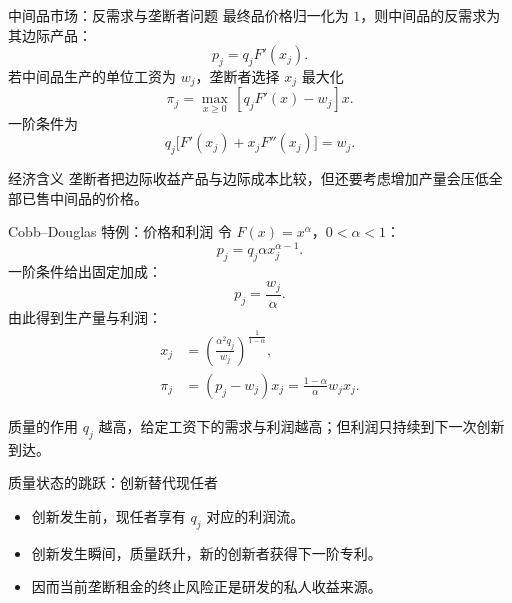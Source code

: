 \documentclass[aspectratio=32]{beamer}
\begin{document}
\begin{frame}{中间品市场：反需求与垄断者问题}
\small
最终品价格归一化为 $1$，则中间品的反需求为其边际产品：
\[
  \boxed{p_j=q_jF'(x_j)}.
\]
若中间品生产的单位工资为 $w_j$，垄断者选择 $x_j$ 最大化
\[
  \pi_j=\max_{x\geq0}\,[q_jF'(x)-w_j]x.
\]
一阶条件为
\[
  q_j\big[F'(x_j)+x_jF''(x_j)\big]=w_j.
\]
\begin{alertblock}{经济含义}
垄断者把边际收益产品与边际成本比较，但还要考虑增加产量会压低全部已售中间品的价格。
\end{alertblock}
\end{frame}

\begin{frame}{Cobb--Douglas 特例：价格和利润}
\small
令 $F(x)=x^\alpha$，$0<\alpha<1$：
\[
  p_j=q_j\alpha x_j^{\alpha-1}.
\]
一阶条件给出固定加成：
\[
  \boxed{p_j=\frac{w_j}{\alpha}}.
\]
由此得到生产量与利润：
\begin{align*}
  x_j&=\left(\frac{\alpha^2q_j}{w_j}\right)^{\frac{1}{1-\alpha}},\\
  \pi_j&=(p_j-w_j)x_j
  =\frac{1-\alpha}{\alpha}w_jx_j.
\end{align*}
\begin{block}{质量的作用}
$q_j$ 越高，给定工资下的需求与利润越高；但利润只持续到下一次创新到达。
\end{block}
\end{frame}

\begin{frame}{质量状态的跳跃：创新替代现任者}
\small
\begin{center}
\end{center}
\vspace{0.16cm}
\begin{itemize}
  \item 创新发生前，现任者享有 $q_j$ 对应的利润流。
  \item 创新发生瞬间，质量跃升，新的创新者获得下一阶专利。
  \item 因而当前垄断租金的终止风险正是研发的私人收益来源。
\end{itemize}
\end{frame}
\end{document}
